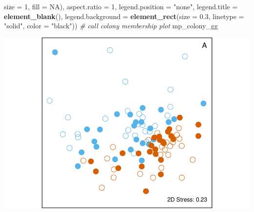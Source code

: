 \documentclass[]{article}
\newenvironment{Shaded}{\begin{snugshade}}{\end{snugshade}}
\newcommand{\KeywordTok}[1]{\textcolor[rgb]{0.13,0.29,0.53}{\textbf{#1}}}
\newcommand{\DataTypeTok}[1]{\textcolor[rgb]{0.13,0.29,0.53}{#1}}
\newcommand{\DecValTok}[1]{\textcolor[rgb]{0.00,0.00,0.81}{#1}}
\newcommand{\FloatTok}[1]{\textcolor[rgb]{0.00,0.00,0.81}{#1}}
\newcommand{\StringTok}[1]{\textcolor[rgb]{0.31,0.60,0.02}{#1}}
\newcommand{\CommentTok}[1]{\textcolor[rgb]{0.56,0.35,0.01}{\textit{#1}}}
\newcommand{\OtherTok}[1]{\textcolor[rgb]{0.56,0.35,0.01}{#1}}
\newcommand{\NormalTok}[1]{#1}
\begin{document}
\begin{Shaded}
\begin{Highlighting}[]
        \DataTypeTok{size =} \DecValTok{1}\NormalTok{, }\DataTypeTok{fill =} \OtherTok{NA}\NormalTok{), }\DataTypeTok{aspect.ratio =} \DecValTok{1}\NormalTok{, }
        \DataTypeTok{legend.position =} \StringTok{"none"}\NormalTok{, }\DataTypeTok{legend.title =} \KeywordTok{element_blank}\NormalTok{(), }
        \DataTypeTok{legend.background =} \KeywordTok{element_rect}\NormalTok{(}\DataTypeTok{size =} \FloatTok{0.3}\NormalTok{, }
            \DataTypeTok{linetype =} \StringTok{"solid"}\NormalTok{, }\DataTypeTok{color =} \StringTok{"black"}\NormalTok{))}
\CommentTok{# call colony membership plot}
\NormalTok{mp_colony_gg}
\end{Highlighting}
\end{Shaded}

\includegraphics{SealScent_SI_Markdown_2020_1_files/figure-latex/Colony membership in SSB and FWB mom-pup pairs-1.pdf}
\end{document}
